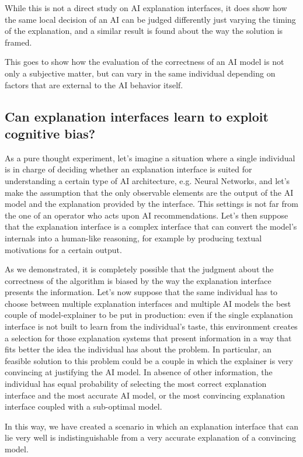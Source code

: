 \documentclass[conference]{IEEEtran}
\begin{document}
While this is not a direct study on AI explanation interfaces, it does show how the same local decision of an AI can be judged differently just varying the timing of the explanation, and a similar result is found about the way the solution is framed.

This goes to show how the evaluation of the correctness of an AI model is not only a subjective matter, but can vary in the same individual depending on factors that are external to the AI behavior itself.

\subsection{Can explanation interfaces learn to exploit cognitive bias?}
\label{sec:exploit}

As a pure thought experiment, let's imagine a situation where a single individual is in charge of deciding whether an explanation interface is suited for understanding a certain type of AI architecture, e.g. Neural Networks, and let's make the assumption that the only observable elements are the output of the AI model and the explanation provided by the interface. This settings is not far from the one of an operator who acts upon AI recommendations. Let's then suppose that the explanation interface is a complex interface that can convert the model's internals into a human-like reasoning, for example by producing textual motivations for a certain output.

As we demonstrated, it is completely possible that the judgment about the correctness of the algorithm is biased by the way the explanation interface presents the information. Let's now suppose that the same individual has to choose between multiple explanation interfaces and multiple AI models the best couple of model-explainer to be put in production: even if the single explanation interface is not built to learn from the individual's taste, this environment creates a selection for those explanation systems that present information in a way that fits better the idea the individual has about the problem. In particular, an feasible solution to this problem could be a couple in which the explainer is very convincing at justifying the AI model. In absence of other information, the individual has equal probability of selecting the most correct explanation interface and the most accurate AI model, or the most convincing explanation interface coupled with a sub-optimal model.

In this way, we have created a scenario in which an explanation interface that can lie very well is indistinguishable from a very accurate explanation of a convincing model.
\end{document}
